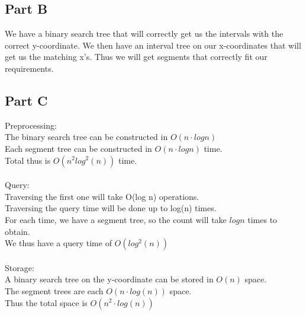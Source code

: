 \documentclass[11pt,psfig]{article}
\begin{document}
\subsection*{Part B}

We have a binary search tree that will correctly get us the intervals with the correct y-coordinate. We then have an interval tree on our x-coordinates that will get us the matching x's. Thus we will get segments that correctly fit our requirements. \\

\subsection*{Part C}

Preprocessing: \\
The binary search tree can be constructed in $O(n \cdot logn)$\\
Each segment tree can be constructed in $O(n \cdot logn)$ time. \\
Total thus is $O(n^2 log^2(n))$ time. \\
\\
Query: \\
Traversing the first one will take O(log n) operations. \\
Traversing the query time will be done up to log(n) times.\\
For each time, we have a segment tree, so the count will take $log n$ times to obtain. \\
We thus have a query time of $O(log^2(n))$\\
\\
Storage:\\
A binary search tree on the y-coordinate can be stored in $O(n)$ space. \\
The segment trees are each $O(n \cdot log(n))$ space. \\
Thus the total space is $O(n^2 \cdot log(n))$

\newpage
\end{document}

